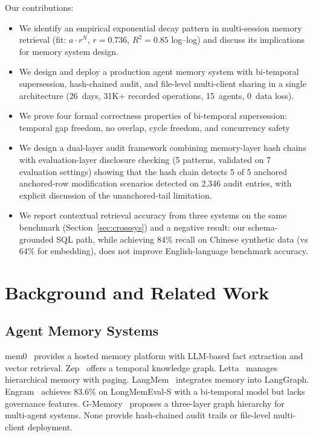 \documentclass{article}
\begin{document}
Our contributions:
\begin{itemize}
\item We identify an empirical exponential decay pattern in multi-session memory retrieval (fit: $a \cdot r^N$, $r = 0.736$, $R^2 = 0.85$ log--log) and discuss its implications for memory system design.
\item We design and deploy a production agent memory system with bi-temporal supersession, hash-chained audit, and file-level multi-client sharing in a single architecture (26~days, 31K+ recorded operations, 15~agents, 0~data loss).
\item We prove four formal correctness properties of bi-temporal supersession: temporal gap freedom, no overlap, cycle freedom, and concurrency safety
\item We design a dual-layer audit framework combining memory-layer hash chains with evaluation-layer disclosure checking (5 patterns, validated on 7 evaluation settings) showing that the hash chain detects 5 of 5 anchored anchored-row modification scenarios detected on 2{,}346 audit entries, with explicit discussion of the unanchored-tail limitation.
\item We report contextual retrieval accuracy from three systems on the same benchmark (Section~\ref{sec:crosssys}) and a negative result: our schema-grounded SQL path, while achieving 84\% recall on Chinese synthetic data (vs 64\% for embedding), does not improve English-language benchmark accuracy.
\end{itemize}

\section{Background and Related Work}
\label{sec:related}

\subsection{Agent Memory Systems}
mem0~\citep{mem0} provides a hosted memory platform with LLM-based fact extraction and vector retrieval. Zep~\citep{zep} offers a temporal knowledge graph. Letta~\citep{letta} manages hierarchical memory with paging. LangMem~\citep{langmem} integrates memory into LangGraph. Engram~\citep{engram} achieves 83.6\% on LongMemEval-S with a bi-temporal model but lacks governance features. G-Memory~\citep{gmotion} proposes a three-layer graph hierarchy for multi-agent systems. None provide hash-chained audit trails or file-level multi-client deployment.
\end{document}
